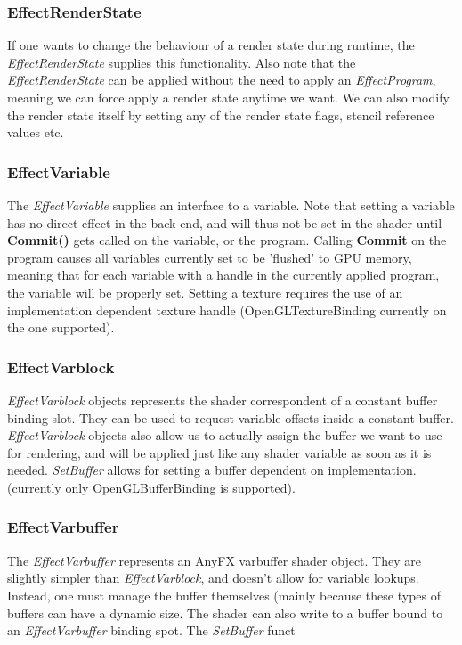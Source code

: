 \documentclass{article}
\begin{document}
\subsubsection{EffectRenderState}
If one wants to change the behaviour of a render state during runtime, the \textit{EffectRenderState} supplies this functionality. Also note that the \textit{EffectRenderState} can be applied without the need to apply an \textit{EffectProgram}, meaning we can force apply a render state anytime we want. We can also modify the render state itself by setting any of the render state flags, stencil reference values etc.

\subsubsection{EffectVariable}
The \textit{EffectVariable} supplies an interface to a variable. Note that setting a variable has no direct effect in the back-end, and will thus not be set in the shader until \textbf{Commit()} gets called on the variable, or the program. Calling \textbf{Commit} on the program causes all variables currently set to be 'flushed' to GPU memory, meaning that for each variable with a handle in the currently applied program, the variable will be properly set. Setting a texture requires the use of an implementation dependent texture handle (OpenGLTextureBinding currently on the one supported). 

\subsubsection{EffectVarblock}
\textit{EffectVarblock} objects represents the shader correspondent of a constant buffer binding slot. They can be used to request variable offsets inside a constant buffer. \textit{EffectVarblock} objects also allow us to actually assign the buffer we want to use for rendering, and will be applied just like any shader variable as soon as it is needed. \textit{SetBuffer} allows for setting a buffer dependent on implementation. (currently only OpenGLBufferBinding is supported). 

\subsubsection{EffectVarbuffer}
The \textit{EffectVarbuffer} represents an AnyFX varbuffer shader object. They are slightly simpler than \textit{EffectVarblock}, and doesn't allow for variable lookups. Instead, one must manage the buffer themselves (mainly because these types of buffers can have a dynamic size. The shader can also write to a buffer bound to an \textit{EffectVarbuffer} binding spot. The \textit{SetBuffer} funct
\end{document}
